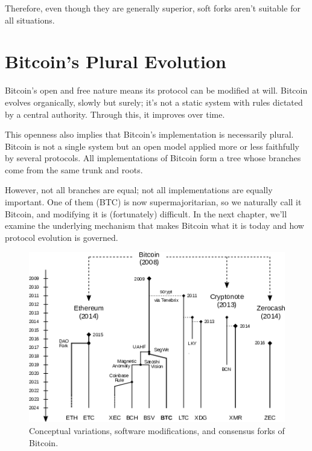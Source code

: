 \documentclass[
  a5paper,
  smalldemyvopaper,10pt,twoside,onecolumn,openright,extrafontsizes,hidelinks]{memoir}
\begin{document}
Therefore, even though they are generally superior, soft forks aren't
suitable for all situations.

\section*{Bitcoin's Plural Evolution}\label{bitcoins-plural-evolution}


Bitcoin's open and free nature means its protocol can be modified at
will. Bitcoin evolves organically, slowly but surely; it's not a static
system with rules dictated by a central authority. Through this, it
improves over time.

This openness also implies that Bitcoin's implementation is necessarily
plural. Bitcoin is not a single system but an open model applied more or
less faithfully by several protocols. All implementations of Bitcoin
form a tree whose branches come from the same trunk and roots.

However, not all branches are equal; not all implementations are equally
important. One of them (BTC) is now supermajoritarian, so we naturally
call it Bitcoin, and modifying it is (fortunately) difficult. In the
next chapter, we'll examine the underlying mechanism that makes Bitcoin
what it is today and how protocol evolution is governed.

\begin{figure}

{\centering \includegraphics{chapters/img/bitcoin-forks-tree.png}

}

\caption{Conceptual variations, software modifications, and consensus
forks of Bitcoin.}

\end{figure}%
\end{document}

